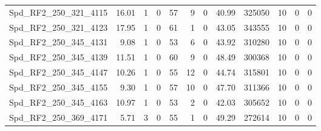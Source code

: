 \begin{longtable}[c]{@{}lrrrrrrrrrrr@{}}
Spd\_RF2\_250\_321\_4115      & 16.01                  & 1                       & 0                       & 57                     & 9                       & 0                       & 40.99                   & 325050                   & 10                       & 0                        & 0                        \\
Spd\_RF2\_250\_321\_4123      & 17.95                  & 1                       & 0                       & 61                     & 1                       & 0                       & 43.05                   & 343555                   & 10                       & 0                        & 0                        \\
Spd\_RF2\_250\_345\_4131      & 9.08                   & 1                       & 0                       & 53                     & 6                       & 0                       & 43.92                   & 310280                   & 10                       & 0                        & 0                        \\
Spd\_RF2\_250\_345\_4139      & 11.51                  & 1                       & 0                       & 60                     & 9                       & 0                       & 48.49                   & 300368                   & 10                       & 0                        & 0                        \\
Spd\_RF2\_250\_345\_4147      & 10.26                  & 1                       & 0                       & 55                     & 12                      & 0                       & 44.74                   & 315801                   & 10                       & 0                        & 0                        \\
Spd\_RF2\_250\_345\_4155      & 9.30                   & 1                       & 0                       & 57                     & 10                      & 0                       & 47.70                   & 311366                   & 10                       & 0                        & 0                        \\
Spd\_RF2\_250\_345\_4163      & 10.97                  & 1                       & 0                       & 53                     & 2                       & 0                       & 42.03                   & 305652                   & 10                       & 0                        & 0                        \\
Spd\_RF2\_250\_369\_4171      & 5.71                   & 3                       & 0                       & 55                     & 1                       & 0                       & 49.29                   & 272614                   & 10                       & 0                        & 0                        \\

\end{longtable}
